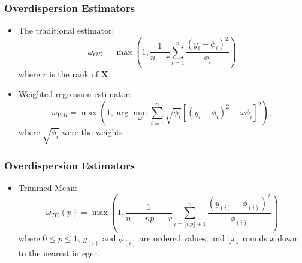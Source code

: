 \documentclass[mathserif,compress]{beamer}\usepackage{graphicx, color}
\def\bX{\mathbf{X}}
\begin{document}

\begin{frame}[fragile]
\frametitle{Overdispersion Estimators}

	\begin{itemize}
	\item The traditional estimator:
	\[
	\omega_{OD} = \max\left(1, \frac{1}{n-r}\sum_{i=1}^n\frac{(y_i-\phi_i)^2}{\phi_i}\right)
	\]
	where $r$ is the rank of $\bX$.
	\item Weighted regression estimator:
	\[
	\omega_{WR} = \max\left(1, \arg\underset{\omega}{\min}\sum_{i=1}^n\sqrt{\phi_i}[(y_i - \phi_i)^2 - \omega\phi_i]^2\right),
	\]
	where $\sqrt{\phi_i}$ were the weights
	\end{itemize}

\end{frame}


\begin{frame}[fragile]
\frametitle{Overdispersion Estimators}

	\begin{itemize}
	\item Trimmed Mean:
	\[
	\omega_{TG}(p) = \max\left(1, \frac{1}{n - \lfloor np \rfloor -r}
		\sum_{i = \lfloor np \rfloor + 1}^n\frac{(y_{(i)}-\phi_{(i)})^2}{\phi_{(i)}}\right)
	\]
	where $0 \le p \le 1$, $y_{(i)}$ and $\phi_{(i)}$ are ordered values, and $\lfloor x \rfloor$ rounds $x$ down to the nearest integer.
	\end{itemize}

\end{frame}

\end{document}

